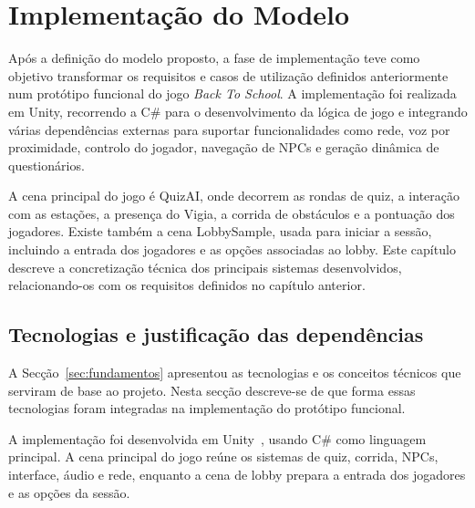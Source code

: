 



\chapter{Implementação do Modelo}
\label{ch:implementacaoDoModelo}

Após a definição do modelo proposto, a fase de implementação teve como objetivo transformar os requisitos e casos de utilização definidos anteriormente num protótipo funcional do jogo \textit{Back To School}. A implementação foi realizada em Unity, recorrendo a C\# para o desenvolvimento da lógica de jogo e integrando várias dependências externas para suportar funcionalidades como rede, voz por proximidade, controlo do jogador, navegação de NPCs e geração dinâmica de questionários.

A cena principal do jogo é QuizAI, onde decorrem as rondas de quiz, a interação com as estações, a presença do Vigia, a corrida de obstáculos e a pontuação dos jogadores. Existe também a cena LobbySample, usada para iniciar a sessão, incluindo a entrada dos jogadores e as opções associadas ao lobby. Este capítulo descreve a concretização técnica dos principais sistemas desenvolvidos, relacionando-os com os requisitos definidos no capítulo anterior.


\section{Tecnologias e justificação das dependências}
\label{sec:tecnologias}

A Secção~\ref{sec:fundamentos} apresentou as tecnologias e os conceitos técnicos que serviram de base ao projeto. Nesta secção descreve-se de que forma essas tecnologias foram integradas na implementação do protótipo funcional.

A implementação foi desenvolvida em Unity~\cite{UnityTechnologies2026}, usando C\# como linguagem principal. A cena principal do jogo reúne os sistemas de quiz, corrida, NPCs, interface, áudio e rede, enquanto a cena de lobby prepara a entrada dos jogadores e as opções da sessão.

